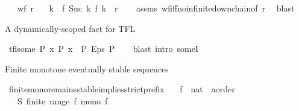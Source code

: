 \begin{isabellebody}
\ \ \ {\isachardoublequoteopen}wf\ r{\isachardoublequoteclose}\isanewline
\ \ \ k\ \ {\isachardoublequoteopen}{\isacharparenleft}{\kern0pt}f\ {\isacharparenleft}{\kern0pt}Suc\ k{\isacharparenright}{\kern0pt}{\isacharcomma}{\kern0pt}\ f\ k{\isacharparenright}{\kern0pt}\ {\isasymnotin}\ r{\isachardoublequoteclose}\isanewline
%
\isadelimproof
\ \ %
\endisadelimproof
%
\isatagproof
{}\isamarkupfalse%
\ assms\ wf{\isacharunderscore}{\kern0pt}iff{\isacharunderscore}{\kern0pt}no{\isacharunderscore}{\kern0pt}infinite{\isacharunderscore}{\kern0pt}down{\isacharunderscore}{\kern0pt}chain{\isacharbrackleft}{\kern0pt}of\ r{\isacharbrackright}{\kern0pt}\ \isamarkupfalse%
\ blast%
\endisatagproof
{\isafoldproof}%
%
\isadelimproof
%
\endisadelimproof
%
\begin{isamarkuptext}%
A dynamically-scoped fact for TFL%
\end{isamarkuptext}\isamarkuptrue%
\isamarkupfalse%
\ tfl{\isacharunderscore}{\kern0pt}some{\isacharcolon}{\kern0pt}\ {\isachardoublequoteopen}{\isasymforall}P\ x{\isachardot}{\kern0pt}\ P\ x\ {\isasymlongrightarrow}\ P\ {\isacharparenleft}{\kern0pt}Eps\ P{\isacharparenright}{\kern0pt}{\isachardoublequoteclose}\isanewline
%
\isadelimproof
\ \ %
\endisadelimproof
%
\isatagproof
{}\isamarkupfalse%
\ {\isacharparenleft}{\kern0pt}blast\ intro{\isacharcolon}{\kern0pt}\ someI{\isacharparenright}{\kern0pt}%
\endisatagproof
{\isafoldproof}%
%
\isadelimproof
%
\endisadelimproof
%
\isadelimdocument
%
\endisadelimdocument
%
\isatagdocument
%
\isamarkuptrue%
%
\endisatagdocument
{\isafolddocument}%
%
\isadelimdocument
%
\endisadelimdocument
%
\begin{isamarkuptext}%
Finite monotone eventually stable sequences%
\end{isamarkuptext}\isamarkuptrue%
\isamarkupfalse%
\ finite{\isacharunderscore}{\kern0pt}mono{\isacharunderscore}{\kern0pt}remains{\isacharunderscore}{\kern0pt}stable{\isacharunderscore}{\kern0pt}implies{\isacharunderscore}{\kern0pt}strict{\isacharunderscore}{\kern0pt}prefix{\isacharcolon}{\kern0pt}\isanewline
\ \ \ f\ {\isacharcolon}{\kern0pt}{\isacharcolon}{\kern0pt}\ {\isachardoublequoteopen}nat\ {\isasymRightarrow}\ {\isacharprime}{\kern0pt}a{\isacharcolon}{\kern0pt}{\isacharcolon}{\kern0pt}order{\isachardoublequoteclose}\isanewline
\ \ \ S{\isacharcolon}{\kern0pt}\ {\isachardoublequoteopen}finite\ {\isacharparenleft}{\kern0pt}range\ f{\isacharparenright}{\kern0pt}{\isachardoublequoteclose}\ {\isachardoublequoteopen}mono\ f{\isachardoublequoteclose}\isanewline

\end{isabellebody}
